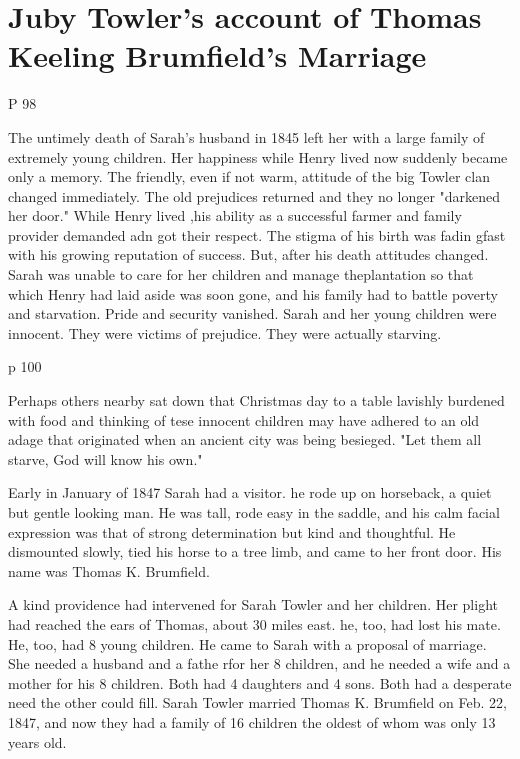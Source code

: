 
\chapter{Juby Towler's account of Thomas Keeling Brumfield's Marriage}


P 98

The untimely death of Sarah's husband in 1845 left her with a large family of extremely young children.  Her happiness while Henry lived now suddenly became only a memory.  The friendly, even if not warm, attitude of the big Towler clan changed immediately.  The old prejudices returned and they no longer "darkened her door."  While Henry lived ,his ability as a successful farmer and family provider demanded adn got their respect.  The stigma of his birth was fadin gfast with his growing reputation of success.  But, after his death attitudes changed.  Sarah was unable to care for her children and manage theplantation so that which Henry had laid aside was soon gone, and his family had to battle poverty and starvation.  Pride and security vanished.  Sarah and her young children were innocent.  They were victims of prejudice.  They were actually starving.

p 100

Perhaps others nearby sat down that Christmas day to a table lavishly burdened with food and thinking of tese innocent children may have adhered to an old adage that originated when an ancient city was being besieged.  "Let them all starve, God will know his own."

Early in January of 1847 Sarah had a visitor.  he rode up on horseback, a quiet but gentle looking man. He was tall, rode easy in the saddle, and his calm facial expression was that of strong determination but kind and thoughtful.  He dismounted slowly, tied his horse to a tree limb, and came to her front door.  His name was Thomas K. Brumfield.

A kind providence had intervened for Sarah Towler and her children.  Her plight had reached the ears of Thomas, about 30 miles east.  he, too, had lost his mate.  He, too, had 8 young children.  He came to Sarah with a proposal of marriage.  She needed a husband and a fathe rfor her 8 children, and he needed a wife and a mother for his 8 children.  Both had 4 daughters and 4 sons.  Both had a desperate need the other could fill.  Sarah Towler married Thomas K. Brumfield on Feb. 22, 1847, and now they had a family of 16 children the oldest of whom was only 13 years old.

